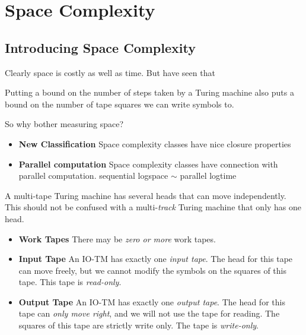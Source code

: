 
\chapter{Space Complexity}



\section{Introducing Space Complexity}

Clearly space is costly as well as time.
But have seen that


Putting a bound on the number of steps taken 
by a Turing machine also puts a bound on the 
number of tape squares we can write symbols to. 

So why bother measuring space?

\begin{itemize}   
\renewcommand{\labelitemi}{$\Box$}
\item \textbf{New Classiﬁcation} 
Space complexity classes have nice closure properties
\item \textbf{Parallel computation} 
Space complexity classes have connection with parallel computation.
sequential logspace $\sim$ parallel logtime
\end{itemize} 

\frmrule



A multi-tape Turing machine has several heads that 
can move independently. This should not be confused with 
a multi-\textit{track} Turing machine that only has one 
head. 

\begin{itemize}   
\renewcommand{\labelitemi}{$\Box$}
\item \textbf{Work Tapes} 
There may be \textit{zero or more} work tapes.
\item \textbf{Input Tape} 
An IO-TM has exactly one \textit{input tape}. 
The head for this tape can move freely, but we 
cannot modify the symbols on the squares of this tape. 
This tape is \textit{read-only}. 
\item \textbf{Output Tape} 
An IO-TM has exactly one \textit{output tape}. 
The head for this tape can \textit{only move right}, and we 
will not use the tape for reading.
The squares of this tape are strictly write only.  
The tape is \textit{write-only}. 
\end{itemize} 


